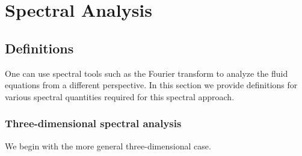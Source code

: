 \documentclass[oneside,a4paper,11pt]{report}
\begin{document}
\chapter{Spectral Analysis}

\section{Definitions}
One can use spectral tools such as the Fourier transform to analyze the fluid equations from a different perspective. In this section we provide definitions for various spectral quantities required for this spectral approach. 

\subsection{Three-dimensional spectral analysis}
We begin with the more general three-dimensional case.
\end{document}
